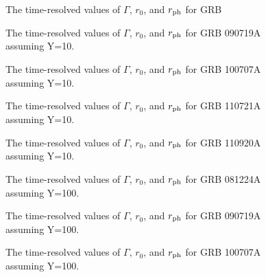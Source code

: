 \newpage

\begin{figure}[tp]
  \centering
  \caption{The time-resolved values of $\Gamma$, $r_0$, and $r_{\rm ph}$ for GRB }
  \label{fig:ski1}
\end{figure}


\begin{figure}[tp]
  \centering
  \caption{The time-resolved values of $\Gamma$, $r_0$, and $r_{\rm ph}$ for GRB 090719A assuming Y=10.}
  \label{fig:ski2}
\end{figure}

\begin{figure}[tp]
  \centering
  \caption{The time-resolved values of $\Gamma$, $r_0$, and $r_{\rm ph}$ for GRB 100707A assuming Y=10.}
  \label{fig:ski3}
\end{figure}


\begin{figure}[tp]
  \centering
  \caption{The time-resolved values of $\Gamma$, $r_0$, and $r_{\rm ph}$ for GRB 110721A assuming Y=10.}
  \label{fig:ski4}
\end{figure}


\begin{figure}[tp]
  \centering
  \caption{The time-resolved values of $\Gamma$, $r_0$, and $r_{\rm ph}$ for GRB 110920A assuming Y=10.}
  \label{fig:ski5}
\end{figure}

\newpage
\begin{figure}[tp]
  \centering
  \caption{The time-resolved values of $\Gamma$, $r_0$, and $r_{\rm ph}$ for GRB 081224A assuming Y=100.}
  \label{fig:ski1}
\end{figure}


\begin{figure}[tp]
  \centering
  \caption{The time-resolved values of $\Gamma$, $r_0$, and $r_{\rm ph}$ for GRB 090719A assuming Y=100.}
  \label{fig:ski2}
\end{figure}

\begin{figure}[tp]
  \centering
  \caption{The time-resolved values of $\Gamma$, $r_0$, and $r_{\rm ph}$ for GRB 100707A assuming Y=100.}
  \label{fig:ski3}
\end{figure}


